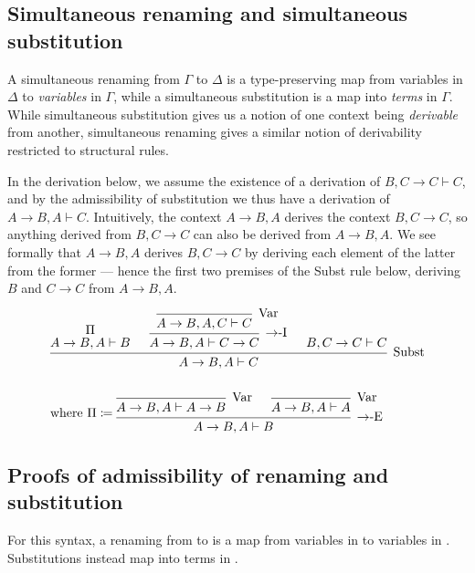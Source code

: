 \def\SimpleKits{../agda/latex/SimpleKits.tex}

\subsection{Simultaneous renaming and simultaneous substitution}

A simultaneous renaming from $\Gamma$ to $\Delta$ is a type-preserving map from
variables in $\Delta$ to \emph{variables} in $\Gamma$, while a simultaneous
substitution is a map into \emph{terms} in $\Gamma$.
While simultaneous substitution gives us a notion of one context being
\emph{derivable} from another, simultaneous renaming gives a similar notion
of derivability restricted to structural rules.

In the derivation below, we assume the existence of a derivation of
$B, C \to C \vdash C$, and by the admissibility of substitution we thus have a
derivation of $A \to B, A \vdash C$.
Intuitively, the context $A \to B, A$ derives the context $B, C \to C$, so
anything derived from $B, C \to C$ can also be derived from $A \to B, A$.
We see formally that $A \to B, A$ derives $B, C \to C$ by deriving each element
of the latter from the former --- hence the first two premises of the Subst
rule below, deriving $B$ and $C \to C$ from $A \to B, A$.

\begin{align*}
  &\begin{prooftree}
    \hypo{\Pi}
    \infer[no rule]1{A \to B, A \vdash B}
    \infer0[Var]{A \to B, A, C \vdash C}
    \infer1[$\to$-I]{A \to B, A \vdash C \to C}
    \hypo{B, C \to C \vdash C}
    \infer3[Subst]{A \to B, A \vdash C}
  \end{prooftree}
  \\\\
  &\textrm{where }\Pi \coloneqq
  \begin{prooftree}
    \infer0[Var]{A \to B, A \vdash A \to B}
    \infer0[Var]{A \to B, A \vdash A}
    \infer2[$\to$-E]{A \to B, A \vdash B}
  \end{prooftree}
\end{align*}

\subsection{Proofs of admissibility of renaming and substitution}

For this syntax, a renaming from \AgdaBound{$\Gamma$} to \AgdaBound{$\Delta$}
is a map from variables in \AgdaBound{$\Delta$} to variables in
\AgdaBound{$\Gamma$}.
Substitutions instead map into terms in \AgdaBound{$\Gamma$}.

